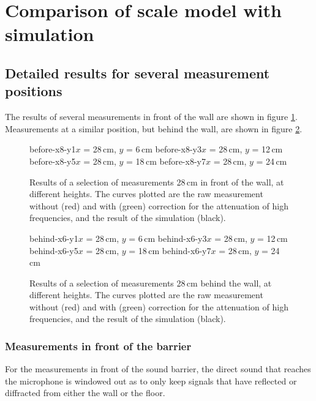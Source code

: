 \section{Comparison of scale model with simulation \label{sectComparison}}

\subsection{Detailed results for several measurement positions}
The results of several measurements in front of the wall are shown in figure \ref{beforePlots}. Measurements at a similar position, but behind the wall, are shown in figure \ref{behindPlots}.


\begin{figure}
\figOctaveTwoNoFigNoCaption{-0.0cm}
	{before-x8-y1}{$x$ = 28\,cm, $y$ = 6\,cm}
	{before-x8-y3}{$x$ = 28\,cm, $y$ = 12\,cm}
\figOctaveTwoNoFigNoCaption{-0.0cm}
	{before-x8-y5}{$x$ = 28\,cm, $y$ = 18\,cm}
	{before-x8-y7}{$x$ = 28\,cm, $y$ = 24\,cm}
\caption{Results of a selection of measurements 28\,cm in front of the wall, at different heights. The curves plotted are the raw measurement without (red) and with (green) correction for the attenuation of high frequencies, and the result of the simulation (black). \label{beforePlots}}
\end{figure}

\begin{figure}
\figOctaveTwoNoFigNoCaption{-0.0cm}
	{behind-x6-y1}{$x$ = 28\,cm, $y$ = 6\,cm}
	{behind-x6-y3}{$x$ = 28\,cm, $y$ = 12\,cm}
\figOctaveTwoNoFigNoCaption{-0.0cm}
	{behind-x6-y5}{$x$ = 28\,cm, $y$ = 18\,cm}
	{behind-x6-y7}{$x$ = 28\,cm, $y$ = 24\,cm}
\caption{Results of a selection of measurements 28\,cm behind the wall, at different heights. The curves plotted are the raw measurement without (red) and with (green) correction for the attenuation of high frequencies, and the result of the simulation (black). \label{behindPlots}}
\end{figure}


\subsubsection*{Measurements in front of the barrier}

For the measurements in front of the sound barrier, the direct sound that reaches the microphone is windowed out as to only keep signals that have reflected or diffracted from either the wall or the floor.

